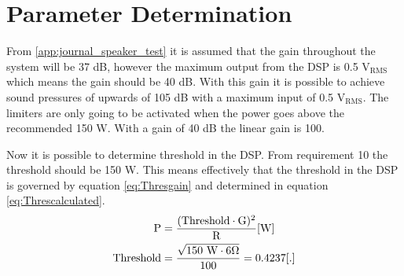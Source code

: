 \section{Parameter Determination}
From \autoref{app:journal_speaker_test} it is assumed that the gain throughout the system will be 37 dB, however the maximum output from the DSP is 0.5 $\text{V}_\text{RMS}$ which means the gain should be 40 dB. With this gain it is possible to achieve sound pressures of upwards of 105 dB with a maximum input of 0.5 $\text{V}_\text{RMS}$. The limiters are only going to be activated when the power goes above the recommended 150 W. With a gain of 40 dB the linear gain is 100.

Now it is possible to determine threshold in the DSP. From requirement 10 the threshold should be 150 W.  This means effectively that the threshold in the DSP is governed by equation \ref{eq:Thresgain} and determined in equation \ref{eq:Threscalculated}.
\vspace{-3mm}
\begin{align}
\text{P}&=\frac{(\text{Threshold} \cdot \text{G})^2}{\text{R}} \enhed{W}\label{eq:Thresgain}
\\
\text{Threshold}&=\frac{\sqrt{150 \text{ W} \cdot 6 \Omega }}{100}=0.4237\enhed{.}\label{eq:Threscalculated}
\end{align}


